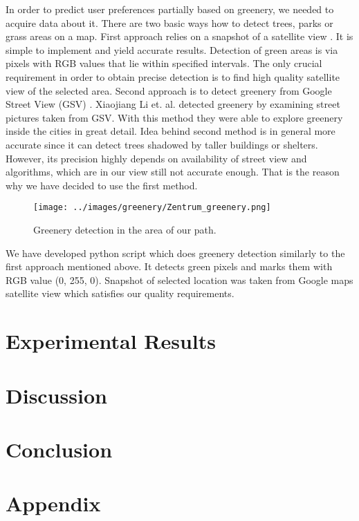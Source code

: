 \documentclass[letterpaper]{article}
\begin{document}
\indent In order to predict user preferences partially based on greenery, we needed to acquire data about it. There are two basic ways how to detect trees, parks or grass areas on a map. First approach relies on a snapshot of a satellite view \cite{smartCities}. It is simple to implement and yield accurate results. Detection of green areas is via pixels with RGB values that lie within specified intervals. The only crucial requirement in order to obtain precise detection is to find high quality satellite view of the selected area.
Second approach is to detect greenery from Google Street View (GSV) \cite{googleView}. Xiaojiang Li et. al. detected greenery by examining street
pictures taken from GSV. With this method they were able to explore greenery inside the cities in great detail. Idea behind second method is in general
more accurate since it can detect trees shadowed by taller buildings or shelters. However, its precision highly depends on availability of street view and
algorithms, which are in our view still not accurate enough. That is the reason why we have decided to use the first method.
 
  \begin{figure}
 	\centering
 	\texttt{[image: ../images/greenery/Zentrum\_greenery.png]}
 	\caption{Greenery detection in the area of our path.}
 	\label{fig:path_greenery}
 \end{figure}

\indent We have developed python script which does greenery detection similarly to the first approach mentioned above. It detects green pixels and marks them with RGB value (0, 255, 0). Snapshot of selected location was taken from Google maps satellite view which satisfies our quality requirements.  %
 

\section{Experimental Results}\label{sec:exp}

\section{Discussion}\label{sec:discussion}


\section{Conclusion}\label{sec:conclusion}




\newpage
\section{Appendix}
\end{document}
